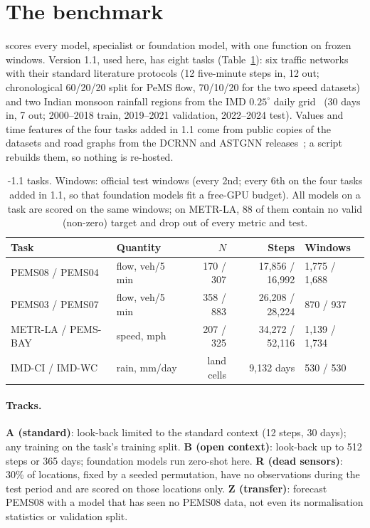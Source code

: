 \section{The \benchname{} benchmark}
\label{sec:bench}

\benchname{} scores every model, specialist or foundation model, with one function on frozen windows. Version
1.1, used here, has eight tasks (Table~\ref{tab:tasks}): six traffic networks with their standard literature
protocols (12 five-minute steps in, 12 out; chronological 60/20/20 split for PeMS flow, 70/10/20 for the two
speed datasets) and two Indian monsoon rainfall regions from the IMD $0.25^\circ$ daily grid~\citep{nandi2024imdlib}
(30 days in, 7 out; 2000--2018 train, 2019--2021 validation, 2022--2024 test). Values and time features of the
four tasks added in 1.1 come from public copies of the datasets and road graphs from the DCRNN and ASTGNN
releases~\citep{li2018dcrnn,guo2019astgcn}; a script rebuilds them, so nothing is re-hosted.

\begin{table}[t]
\caption{\benchname{}-1.1 tasks. Windows: official test windows (every 2nd; every 6th on the four tasks added in
1.1, so that foundation models fit a free-GPU budget). All models on a task are scored on the same windows; on METR-LA, 88 of them contain no valid (non-zero) target
and drop out of every metric and test.}
\label{tab:tasks}
\scriptsize
\setlength{\tabcolsep}{3pt}
\begin{tabular}{@{}llrrl@{}}
\toprule
Task & Quantity & $N$ & Steps & Windows \\
\midrule
PEMS08 / PEMS04 & flow, veh/5 min & 170 / 307 & 17,856 / 16,992 & 1,775 / 1,688 \\
PEMS03 / PEMS07 & flow, veh/5 min & 358 / 883 & 26,208 / 28,224 & 870 / 937 \\
METR-LA / PEMS-BAY & speed, mph & 207 / 325 & 34,272 / 52,116 & 1,139 / 1,734 \\
IMD-CI / IMD-WC & rain, mm/day & land cells & 9,132 days & 530 / 530 \\
\bottomrule
\end{tabular}
\end{table}

\paragraph{Tracks.} \textbf{A (standard)}: look-back limited to the standard context (12 steps, 30 days); any
training on the task's training split. \textbf{B (open context)}: look-back up to 512 steps or 365 days;
foundation models run zero-shot here. \textbf{R (dead sensors)}: 30\% of locations, fixed by a seeded
permutation, have no observations during the test period and are scored on those locations only.
\textbf{Z (transfer)}: forecast PEMS08 with a model that has seen no PEMS08 data, not even its normalisation
statistics or validation split.

